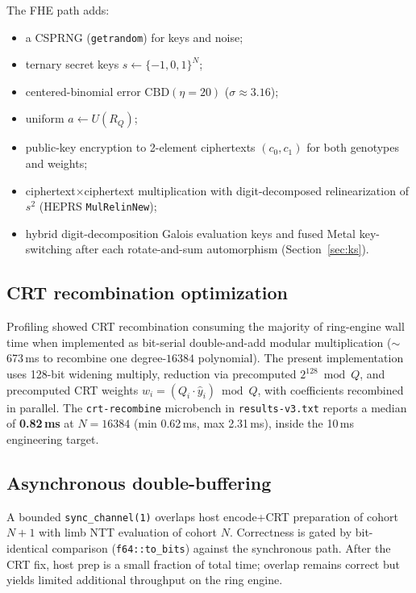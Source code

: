 \documentclass[11pt,a4paper]{article}
\DeclareRobustCommand{\code}[1]{\texttt{#1}}
\DeclareRobustCommand{\file}[1]{\texttt{#1}}
\begin{document}
The FHE path adds:
\begin{itemize}
  \item a CSPRNG (\code{getrandom}) for keys and noise;
  \item ternary secret keys $s \leftarrow \{-1,0,1\}^N$;
  \item centered-binomial error $\mathrm{CBD}(\eta=20)$ ($\sigma \approx 3.16$);
  \item uniform $a \leftarrow U(R_Q)$;
  \item public-key encryption to 2-element ciphertexts $(c_0, c_1)$ for both
        genotypes and weights;
  \item ciphertext$\times$ciphertext multiplication with digit-decomposed
        relinearization of $s^2$ (HEPRS \code{MulRelinNew});
  \item hybrid digit-decomposition Galois evaluation keys and fused Metal
        key-switching after each rotate-and-sum automorphism
        (Section~\ref{sec:ks}).
\end{itemize}

\subsection{CRT recombination optimization}
\label{sec:crt}

Profiling showed CRT recombination consuming the majority of ring-engine wall time
when implemented as bit-serial double-and-add modular multiplication ($\sim$673\,ms
to recombine one degree-$16384$ polynomial). The present implementation uses
128-bit widening multiply, reduction via precomputed $2^{128} \bmod Q$, and
precomputed CRT weights $w_i = (Q_i \cdot \hat{y}_i) \bmod Q$, with coefficients
recombined in parallel. The \code{crt-recombine} microbench in
\file{results-v3.txt} reports a median of \textbf{0.82\,ms} at $N = 16384$
(min 0.62\,ms, max 2.31\,ms), inside the 10\,ms engineering target.

\subsection{Asynchronous double-buffering}
\label{sec:async}

A bounded \code{sync\_channel(1)} overlaps host encode+CRT preparation of cohort
$N{+}1$ with limb NTT evaluation of cohort $N$. Correctness is gated by
bit-identical comparison (\code{f64::to\_bits}) against the synchronous path. After
the CRT fix, host prep is a small fraction of total time; overlap remains correct
but yields limited additional throughput on the ring engine.
\end{document}
